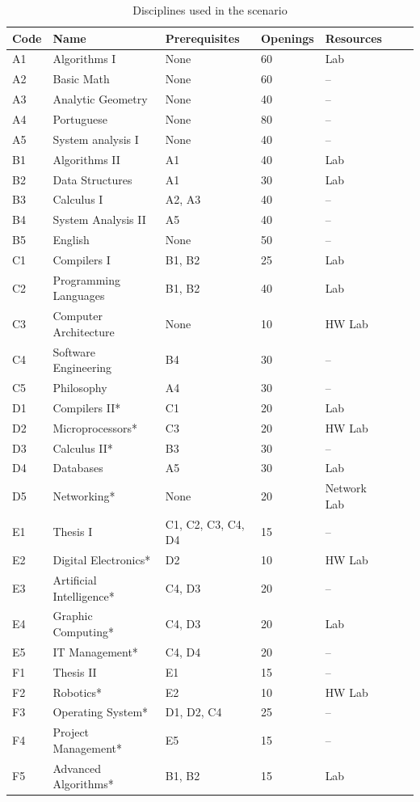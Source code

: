 \documentclass{svjour3}                     %
\begin{document}
\begin{table}\centering\footnotesize
  \begin{tabular*}{1\textwidth}{@{}lllllll@{}}
    \toprule
    Code & Name & Prerequisites & Openings & Resources \\
    \midrule
    A1 & Algorithms I           & None & 60 & Lab \\
    A2 & Basic Math   & None & 60 & -- \\
    A3 & Analytic Geometry    & None & 40 & -- \\
    A4 & Portuguese              & None & 80 & -- \\
    A5 & System analysis I  & None & 40 & -- \\
    \midrule
    B1 & Algorithms II          & A1 & 40 & Lab \\
    B2 & Data Structures     & A1 & 30 & Lab \\
    B3 & Calculus I              & A2, A3 & 40 & -- \\
    B4 & System Analysis II & A5 & 40 & -- \\
    B5 & English                 & None & 50 & -- \\
    \midrule
    C1 & Compilers I         & B1, B2 & 25 & Lab \\
    C2 & Programming Languages & B1, B2 & 40 & Lab \\
    C3 & Computer Architecture & None & 10 & HW Lab \\
    C4 & Software Engineering & B4 & 30 & -- \\
    C5 & Philosophy              & A4 & 30 & -- \\
    \midrule
    D1 & Compilers II*       & C1 & 20 & Lab \\
    D2 & Microprocessors*    & C3 & 20 & HW Lab \\
    D3 & Calculus II*            & B3 & 30 & -- \\
    D4 & Databases        & A5 & 30 & Lab \\
    D5 & Networking*                 & None & 20 & Network Lab \\
    \midrule
    E1 & Thesis I                  & C1, C2, C3, C4, D4 & 15 & -- \\
    E2 & Digital Electronics*    & D2 & 10 & HW Lab \\
    E3 & Artificial Intelligence* & C4, D3 & 20 & -- \\
    E4 & Graphic Computing*    & C4, D3 & 20 & Lab \\
    E5 & IT Management*        & C4, D4 & 20 & -- \\
    \midrule
    F1 & Thesis II                 & E1 & 15 & -- \\
    F2 & Robotics*              & E2 & 10 & HW Lab \\
    F3 & Operating System* & D1, D2, C4 & 25 & -- \\
    F4 & Project Management*  & E5 & 15 & -- \\
    F5 & Advanced Algorithms*  & B1, B2 & 15 & Lab \\
    \bottomrule
  \end{tabular*}
  \caption{Disciplines used in the scenario}
  \label{tab:curso}
\end{table}
\end{document}
